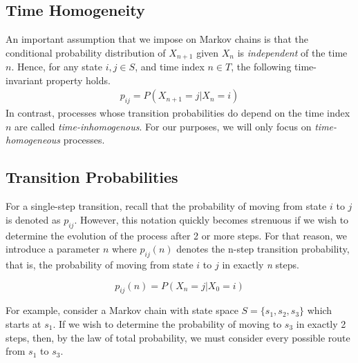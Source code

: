 \documentclass[a4paper,12pt]{article}
\theoremstyle{definition}
\begin{document}
\subsection{Time Homogeneity}
	
	An important assumption that we impose on Markov chains is that the conditional probability 
	distribution of $X_{n+1}$ given $X_n$ is \emph{independent} of the time $n$. Hence, for any state $i,j \in S$, and time index $n \in T$,
	the following time-invariant property holds.
	\begin{equation*}
		\begin{aligned}
			p_{ij} = P(X_{n+1} = j | X_{n} = i)
		\end{aligned}
	\end{equation*}
	In contrast, processes whose transition probabilities do depend on the time index $n$ are called \emph{time-inhomogenous}.
	For our purposes, we will only focus on \emph{time-homogeneous} processes.
	
\subsection{Transition Probabilities}
	
	For a single-step transition, recall that the probability of moving from state $i$ to $j$ is denoted as $p_{ij}$. 
	However, this notation quickly becomes strenuous if we wish to determine the evolution of the process after 2 or more
	steps. For that reason, we introduce a parameter $n$ where $p_{ij}(n)$ denotes the n-step transition 
	probability, that is, the probability of moving from state $i$ to $j$ in exactly \emph{n} steps. 
		
	\[p_{ij}(n) = P(X_{n} = j | X_{0} = i)\]
	
	For example, consider a Markov chain with state space $S = \{s_1, s_2, s_3\}$ which starts at $s_1$. If we wish 
	to determine the probability of moving to $s_3$ in exactly 2 steps, then, by the law of total probability, we must consider 
	every possible route from $s_1$ to $s_3$.
\end{document}
